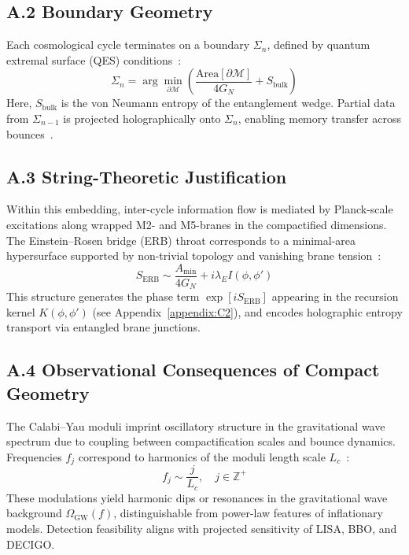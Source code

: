 \subsection*{A.2 Boundary Geometry}

Each cosmological cycle terminates on a boundary \( \Sigma_n \), defined by quantum extremal surface (QES) conditions~\cite{engelhardt2015coarse}:
\[
\Sigma_n = \arg\min_{\partial \mathcal{M}} \left( \frac{\mathrm{Area}[\partial \mathcal{M}]}{4G_N} + S_{\text{bulk}} \right)
\]
Here, \( S_{\text{bulk}} \) is the von Neumann entropy of the entanglement wedge. Partial data from \( \Sigma_{n-1} \) is projected holographically onto \( \Sigma_n \), enabling memory transfer across bounces~\cite{almheiri2019entropy}.

\subsection*{A.3 String-Theoretic Justification}

Within this embedding, inter-cycle information flow is mediated by Planck-scale excitations along wrapped M2- and M5-branes in the compactified dimensions. The Einstein–Rosen bridge (ERB) throat corresponds to a minimal-area hypersurface supported by non-trivial topology and vanishing brane tension~\cite{maldacena2013cool}:
\[
S_{\text{ERB}} \sim \frac{A_{\text{min}}}{4G_N} + i \lambda_E I(\phi, \phi')
\]
This structure generates the phase term \( \exp[i S_{\text{ERB}}] \) appearing in the recursion kernel \( K(\phi, \phi') \) (see Appendix~\ref{appendix:C2}), and encodes holographic entropy transport via entangled brane junctions.

\subsection*{A.4 Observational Consequences of Compact Geometry}

The Calabi–Yau moduli imprint oscillatory structure in the gravitational wave spectrum due to coupling between compactification scales and bounce dynamics. Frequencies \( f_j \) correspond to harmonics of the moduli length scale \( L_c \)~\cite{dienes1997string}:
\[
f_j \sim \frac{j}{L_c}, \quad j \in \mathbb{Z}^+
\]
These modulations yield harmonic dips or resonances in the gravitational wave background \( \Omega_{\text{GW}}(f) \), distinguishable from power-law features of inflationary models. Detection feasibility aligns with projected sensitivity of LISA, BBO, and DECIGO.

